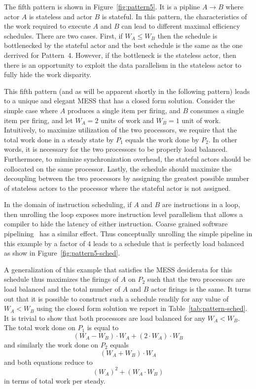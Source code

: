 The fifth pattern is shown in Figure~\ref{fig:pattern5}. It is a
pipline $A\rightarrow B$ where actor $A$ is stateless and actor $B$ is
stateful. In this pattern, the characteristics of the work required to
execute $A$ and $B$ can lead to different maximal efficiency schedules.
There are two cases. First, if $W_A \le W_B$ then the schedule is
bottlenecked by the stateful actor and the best schedule is the same
as the one derrived for Pattern~4. However, if the bottleneck is the
stateless actor, then there is an opportunity to exploit the data
parallelism in the stateless actor to fully hide the work disparity.

This fifth pattern (and as will be apparent shortly in the following
pattern) leads to a unique and elegant MESS that has a closed form
solution. Consider the simple case where $A$ produces a single item
per firing, and $B$ consumes a single item per firing, and let $W_A =
2$ units of work and $W_B = 1$ unit of work. Intuitively, to maximize
utilization of the two processors, we require that the total work
done in a steady state by $P_1$ equals the work done by $P_2$. In other
words, it is necessary for the two processors to be properly load
balanced. Furthermore, to miminize synchronization overhead, the
stateful actors should be collocated on the same processor. Lastly,
the schedule should maximize the decoupling between the two processors
by assigning the greatest possible number of stateless actors to the
processor where the stateful actor is not assigned.

In the domain of instruction scheduling, if $A$ and $B$ are
instructions in a loop, then unrolling the loop exposes more
instruction level parallelism that allows a compiler to hide the
latency of either instruction. Coarse grained software
pipelining~\cite{mgordon-aplos06} has a similar effect. Thus
conceptually unrolling the simple pipeline in this example by a factor
of 4 leads to a schedule that is perfectly load balanced as show in
Figure~\ref{fig:pattern5-sched}. 

A generalization of this example that satisfies the MESS desiderata
for this schedule thus maximizes the firings of $A$ on $P_2$ such that
the two processors are load balanced and the total number of $A$ and
$B$ actor firings is the same. It turns out that it is possible to
construct such a schedule readily for any value of $W_A < W_B$ using
the closed form solution we report in
Table~\ref{tab:pattern-sched}. It is trivial to show that both
processors are load balanced for any $W_A < W_B$. The total work done
on $P_1$ is equal to
\[
(W_A - W_B) \cdot W_A + (2 \cdot W_A) \cdot W_B
\]
and similarly the work done on $P_2$ equals
\[
(W_A + W_B) \cdot W_A
\]
and both equations reduce to 
\[
(W_A)^2 + (W_A \cdot W_B)
\]
in terms of total work per steady.

